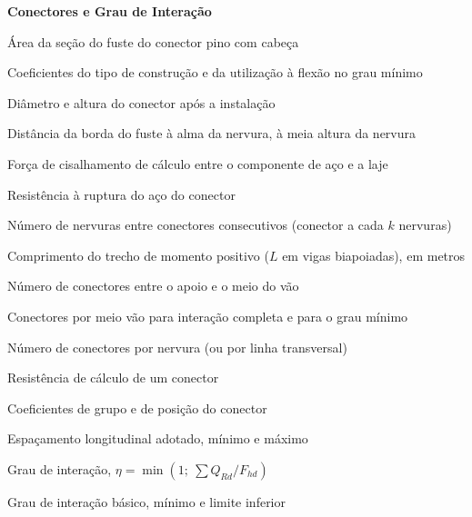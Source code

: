 \begin{simbolos}
  \item[] \textbf{Conectores e Grau de Interação}
  \item[$A_{cs}$] Área da seção do fuste do conector pino com cabeça
  \item[$c_p, c_r$] Coeficientes do tipo de construção e da utilização à flexão no grau mínimo
  \item[$d_{cs}, h_{cs}$] Diâmetro e altura do conector após a instalação
  \item[$e_{mh}$] Distância da borda do fuste à alma da nervura, à meia altura da nervura
  \item[$F_{hd}$] Força de cisalhamento de cálculo entre o componente de aço e a laje
  \item[$f_{ucs}$] Resistência à ruptura do aço do conector
  \item[$k$] Número de nervuras entre conectores consecutivos (conector a cada $k$ nervuras)
  \item[$L_e$] Comprimento do trecho de momento positivo ($L$ em vigas biapoiadas), em metros
  \item[$n$] Número de conectores entre o apoio e o meio do vão
  \item[$n_{compl}, n_{min}$] Conectores por meio vão para interação completa e para o grau mínimo
  \item[$n_t$] Número de conectores por nervura (ou por linha transversal)
  \item[$Q_{Rd}$] Resistência de cálculo de um conector
  \item[$R_g, R_p$] Coeficientes de grupo e de posição do conector
  \item[$s, s_{min}, s_{max}$] Espaçamento longitudinal adotado, mínimo e máximo
  \item[$\eta$] Grau de interação, $\eta = \min(1;\ \sum Q_{Rd}/F_{hd})$
  \item[$\eta_0, \eta_i, \eta_{lim}$] Grau de interação básico, mínimo e limite inferior


\end{simbolos}
